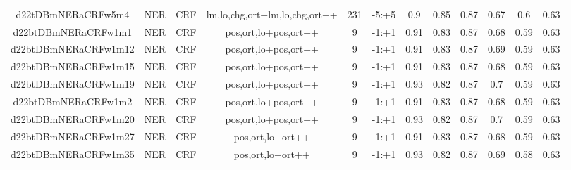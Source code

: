 \documentclass[a4paper]{article}
\begin{document}
\begin{landscape}
\begin{center}
\begin{tabular}{ |c|c|c|c|c|c|c|c|c|c|c|c|}
 
 	
 	\small{ d22tDBmNERaCRFw5m4 } & \small{ NER} & \small{  CRF }  & lm,lo,chg,ort+lm,lo,chg,ort++  &  231 &  \small{  -5:+5 }  &  0.9 & 0.85 & 0.87  &  0.67 & 0.6 & 0.63 \\
 	

 
 	
 	\small{ d22btDBmNERaCRFw1m1 } & \small{ NER} & \small{  CRF }  & pos,ort,lo+pos,ort++  &  9 &  \small{  -1:+1 }  &  0.91 & 0.83 & 0.87  &  0.68 & 0.59 & 0.63 \\
 	

 
 	
 	\small{ d22btDBmNERaCRFw1m12 } & \small{ NER} & \small{  CRF }  & pos,ort,lo+pos,ort++  &  9 &  \small{  -1:+1 }  &  0.91 & 0.83 & 0.87  &  0.69 & 0.59 & 0.63 \\
 	

 
 	
 	\small{ d22btDBmNERaCRFw1m15 } & \small{ NER} & \small{  CRF }  & pos,ort,lo+pos,ort++  &  9 &  \small{  -1:+1 }  &  0.91 & 0.83 & 0.87  &  0.68 & 0.59 & 0.63 \\
 	

 
 	
 	\small{ d22btDBmNERaCRFw1m19 } & \small{ NER} & \small{  CRF }  & pos,ort,lo+pos,ort++  &  9 &  \small{  -1:+1 }  &  0.93 & 0.82 & 0.87  &  0.7 & 0.59 & 0.63 \\
 	

 
 	
 	\small{ d22btDBmNERaCRFw1m2 } & \small{ NER} & \small{  CRF }  & pos,ort,lo+pos,ort++  &  9 &  \small{  -1:+1 }  &  0.91 & 0.83 & 0.87  &  0.68 & 0.59 & 0.63 \\
 	

 
 	
 	\small{ d22btDBmNERaCRFw1m20 } & \small{ NER} & \small{  CRF }  & pos,ort,lo+pos,ort++  &  9 &  \small{  -1:+1 }  &  0.93 & 0.82 & 0.87  &  0.7 & 0.59 & 0.63 \\
 	

 
 	
 	\small{ d22btDBmNERaCRFw1m27 } & \small{ NER} & \small{  CRF }  & pos,ort,lo+ort++  &  9 &  \small{  -1:+1 }  &  0.91 & 0.83 & 0.87  &  0.68 & 0.59 & 0.63 \\
 	

 
 	
 	\small{ d22btDBmNERaCRFw1m35 } & \small{ NER} & \small{  CRF }  & pos,ort,lo+ort++  &  9 &  \small{  -1:+1 }  &  0.93 & 0.82 & 0.87  &  0.69 & 0.58 & 0.63 \\
 	


\end{tabular}
\end{center}
\end{landscape}
\end{document}
